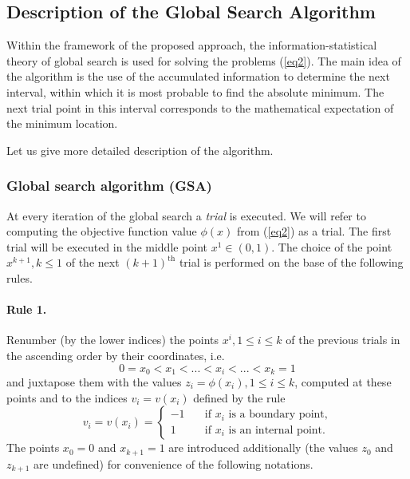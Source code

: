 \documentclass[runningheads]{llncs}
\begin{document}
\subsection{Description of the Global Search Algorithm}

Within the framework of the proposed approach, the information-statistical theory of global search is used for solving the problems (\ref{eq2}). The main idea of the algorithm is the use of the accumulated information to determine the next interval, within which it is most probable to find the absolute minimum. The next trial point in this interval corresponds to the mathematical expectation of the minimum location.

Let us give more detailed description of the algorithm.

\subsubsection{Global search algorithm (GSA)} At every iteration of the global search a \textit{trial} is executed. We will refer to computing the objective function value  $\phi (x)$ from (\ref{eq2}) as a trial. The first trial will be executed in the middle point $x^1 \in (0,1)$. The choice of the point $x^{k+1}, k \leq 1$ of the next $(k+1)^\text{th}$ trial is performed on the base of the following rules.

\paragraph{Rule 1.} Renumber (by the lower indices) the points $x^i, 1 \leq i \leq k$  of the previous trials in the ascending order by their coordinates, i.e.
\begin{equation}\label{eq5} 
0=x_0 < x_1 < ... < x_i < ... < x_k=1
\end{equation}
and juxtapose them with the values $z_i=\phi (x_i), 1 \leq i \leq k$, computed at these points and to the indices $v_i=v(x_i)$ defined by the rule
\begin{equation}\label{eq6} 
v_i=v(x_i)=
  \begin{cases}
    -1 & {\quad \text{if } x_i \text{ is a boundary point,}}\\
    1  & {\quad \text{if } x_i \text{ is an internal point.}}
  \end{cases}
\end{equation}
The points $x_0=0$ and $x_{k+1}=1$ are introduced additionally (the values $z_0$ and $z_{k+1}$ are undefined) for convenience of the following notations.
\end{document}
